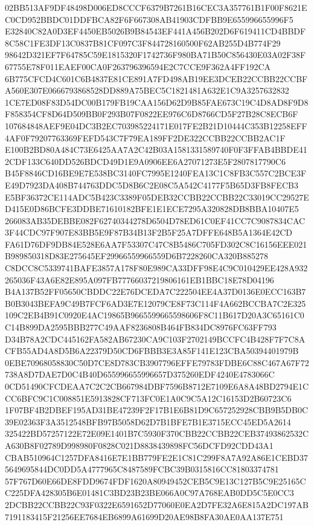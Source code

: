 \documentclass[UTF8,fontset=fandol,zihao=-4,a4paper]{ctexart}
\begin{document}
{{02BB513AF9DF48498D006ED8CCCF6379B7261B16CEC3A357761B1F00F8621EC0CD952BBDC01DDFBCA82F6F667308AB41903CDFBB9E655996655996F5
E32840C82A0D3EF4450EB5026B9B84543EF441A456B202D6F619411CD4BBDF8C58C1FE3DF13C0837B81CF097C3F844728160500F62AB255D4B774F29
98642D321EF7F64785C59E1815320F1742736F980BA71B50C856430E03A02F38F67755E78F011EAEF00CA0F263796396594E2C7CCE9F362A4FF192CA
6B775CFCD4C601C6B4837E81CE891A7FD498AB19EE3DCEB22CCBB22CCBFA560E307E0666793868528DD889A75BEC5C1821481A632E1C9A3257632832
1CE7ED08F83D54DC00B179FB19CAA156D62D9B85FAE673C19C4D8AD8F9D8F858354CF8D64D509BB0F293B07F0822EE976C6D8766CD5F27B28C8ECB6F
107684848AEF9E04DC3B2EC703985224171E017FE2B21D10444C353B12258EFF4AF0F79207763369FEFD543C7F79EA189FF2DE322CCBB22CCBB2AC1F
E100B2BD80A484C73E6425AA7A2C42B03A1581331589740F0F3FFAB4BBDE412CDF133C640DD526BDCD49D1E9A0906EE6A27071273E5F2807817790C6
B45F8846CD16BE9E7E538BC3140FC7995E1240FEA13C1C8FB3C557C2BCE3FE49D7923DA408B744763DDC5D8B6C2E08C5A542C4177F5B65D3FB8FECB3
E5BF36372CE114ADC5B423C3389F05DEB32CCBB22CCBB22C33019CC29527ED415E0D86BCFE3DDBE71610182BFE1E1ECE7295A320828DB8BBA10407E5
266083AB35DEBBE082F62740344278D6504D78ED61C0EF41CC7C9087834CAC3F44CDC97F907E83BB5E9F87B34B13F2B5F25A7DFFE648B5A1364E42CD
FA61D76DF9DB84E528E6AA7F53307C47C8B5486C705FD302C8C16156EEE021B989850318D83E275645EF29966559966559D6B7228260CA320B885278
C8DCC8C5339741BAFE3857A178F80E989CA33DFF98E4C9C010429EE428A932265036F43A6E82E895A097FB77766037219806161EB1BBC18E78D04196
B4A137B52FF05650CBDDC22E76DCEDA7C222504EE4A37D0136E0ECC163B7B0B3043BEFA9C49B7FCF6AD3E7E12079CE8F73C114F4A662BCCBA7C2E325
109C2EB4B91C0920E4AC19865B9665599665598606F8C11B617D20A3C65161C0C14B899DA2595BBB277C49AAF8236808B464FB834DC8976FC63FF793
D34B78A2CDC445162FA582AB67230CA9C103F2702149BCCFC4B428F7F7C8ACFB55AD4A8D5B6A22379D50CD6FBBB3E3A85F141E123CBA50394401979B
0EBE70968058830C50D7CE8D783CB3907796EFFE79783FDBE6C88C467A67F72738A8D7DAE7D0C4B40D655996655996657D375260EDF4240E4783066C
0CD51490CFCDEAA7C2C2CB667984DBF7596B8712E7109E6A8A48BD2794E1CCC6BFC9C1C008851E5913828CF713FC0E1A0C9C5A12C16153D2B60723C6
1F07BF4B2DBEF195AD31BE47239F2F17B1E6B81D9C657252928CBB9B5DB0C39E02363F3A3512548BFB97B5058D62D7B1BFE7B1E3715ECC45ED5A2614
325422BD57257122E72E09E1401B7C5930F370CBB22CCBB22CEB37493862532CA630B8F02789D998980F0828C021D8838439898FC56DCFD92CDD43A1
CBAB510964C1257DFA8416E7E1BB779FE2E1C81C299F8A7A92A86E1CEBD375649695844DC0DD5A4777965C8487589FCBC39B0315816CC81803374781
57F767D60E66DE8FDD9674FDF1620A80949452CEB5C9E13C127B5C9E25165CC225DFA428305B6E01481C3BD23B23BE066A0C97A768EAB0DD5C5E0CC3
2DCBB22CCBB22C93F0322E6591652D77060E0EA2D7FE32A6E815A2DC197AB7191183415F21256EE7684EB6899A61699D20AE98B8FA30AE0AA137E751
}}
\end{document}
